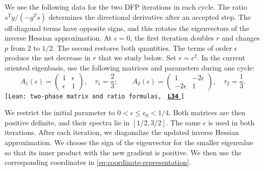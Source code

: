\documentclass[11pt]{article}
\newcommand{\leanLinkText}[1]{%
  \underline{\textbf{#1}}%
}
\newcommand{\leanSnapshot}{e308927f5b7930bdd002f0c0e42b9d112ad821cb}
\newcommand{\leanClaimTag}[3]{%
  {\footnotesize\texttt{[Lean: #1, }}%
  \href{https://github.com/imathwy/DFP_wolfe_local/blob/\leanSnapshot/#2?plain=1\#L#3}%
    {\leanLinkText{\footnotesize\texttt{L#3}}}%
  {\footnotesize\texttt{]}}\enspace
}
\begin{document}
We use the following data for the two DFP iterations in each cycle.  The ratio
$s^Ty/(-g^Ts)$ determines the directional derivative after an accepted step.
The off-diagonal terms have opposite signs, and this rotates the eigenvectors
of the inverse Hessian approximation.  At $\epsilon=0$, the first iteration
doubles $r$ and changes $p$ from $2$ to $1/2$.  The second restores both
quantities.  The terms of order $\epsilon$ produce the net decrease in $r$
that we study below.  Set $r=\epsilon^2$.  In the current oriented eigenbasis,
use the following matrices and parameters during one cycle:
\begin{equation}\label{eq:alternating-secant-data}
A_1(\epsilon)=
\begin{pmatrix}1&\epsilon\\ \epsilon&1\end{pmatrix},
\quad \tau_1=\frac23;
\qquad
A_2(\epsilon)=
\begin{pmatrix}1&-2\epsilon\\ -2\epsilon&1\end{pmatrix},
\quad \tau_2=\frac13.
\end{equation}
\leanClaimTag{two-phase matrix and ratio formulas}{ReasLib/Optimization/DFP/TwoPhaseControls.lean}{34}
We restrict the initial parameter to
$0<\epsilon\le\epsilon_0<1/4$.  Both matrices are then positive definite, and
their spectra lie in $[1/2,3/2]$.  The same $\epsilon$ is used in both
iterations.  After each iteration, we diagonalize the updated inverse Hessian
approximation.  We choose the sign of the eigenvector for the smaller
eigenvalue so that its inner product with the new gradient is positive.  We
then use the corresponding coordinates in
\eqref{eq:coordinate-representation}.
\end{document}
